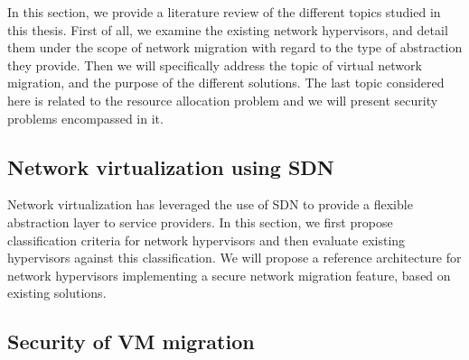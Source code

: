 \documentclass[a4paper, 11pt]{article}
\begin{document}

In this section, we provide a literature review of the different topics studied in this thesis.
First of all, we examine the existing network hypervisors, and detail them under the scope of network migration with regard to the type of abstraction they provide.
Then we will specifically address the topic of virtual network migration, and the purpose of the different solutions.
The last topic considered here is related to the resource allocation problem and we will present 
security problems encompassed in it.

\subsection{Network virtualization using SDN}

Network virtualization has leveraged the use of SDN to provide a flexible abstraction layer to service providers. In this section, we first propose classification criteria for network hypervisors and then evaluate existing hypervisors against this classification. We will propose a reference architecture for network hypervisors implementing a secure network migration feature, based on existing solutions.















\subsection{Security of VM migration}
\end{document}
